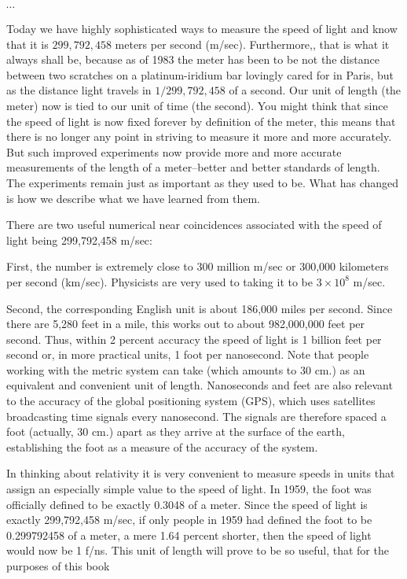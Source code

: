 $\cdots$

Today we have highly sophisticated ways to measure the speed of light and know that it is $299,792,458$ meters per second (m/sec). Furthermore,, that is what it always shall be, because as of 1983 the meter has been  to be not the distance between two scratches on a platinum-iridium bar lovingly cared for in Paris, but as the distance light travels in $1/299,792,458$ of a second. Our unit of length (the meter) now is tied to our unit of time (the second). You might think that since the speed of light is now fixed forever by definition of the meter, this means that there is no longer any point in striving to measure it more and more accurately. But such improved experiments now provide more and more accurate measurements of the length of a meter--better and better standards of length. The experiments remain just as important as they used to be. What has changed is how we describe what we have learned from them. 

There are two useful numerical near coincidences associated with the speed of light being 299,792,458 m/sec:

First, the number is extremely close to 300 million m/sec or 300,000 kilometers per second (km/sec). Physicists are very used to taking it to be $3 \times 10^8$ m/sec. 

Second, the corresponding English unit is about 186,000 miles per second. Since there are 5,280 feet in a mile, this works out to about 982,000,000 feet per second. Thus, within 2 percent accuracy the speed of light is 1 billion feet per second or, in more practical units, 1 foot per nanosecond. Note that people working with the metric system can take  (which amounts to 30 cm.) as an equivalent and convenient unit of length. Nanoseconds and feet are also relevant to the accuracy of the global positioning system (GPS), which uses satellites broadcasting time signals every nanosecond. The signals are therefore spaced a foot (actually, 30 cm.) apart as they arrive at the surface of the earth, establishing the foot as a measure of the accuracy of the system.

In thinking about relativity it is very convenient to measure speeds in units that assign an especially simple value to the speed of light. In 1959, the foot was officially defined to be exactly 0.3048 of a meter. Since the speed of light is exactly 299,792,458 m/sec, if only people in 1959 had defined the foot to be 0.299792458 of a meter, a mere 1.64 percent shorter, then the speed of light would now be  1 f/ns. This unit of length will prove to be so useful, that for the purposes of this book 

